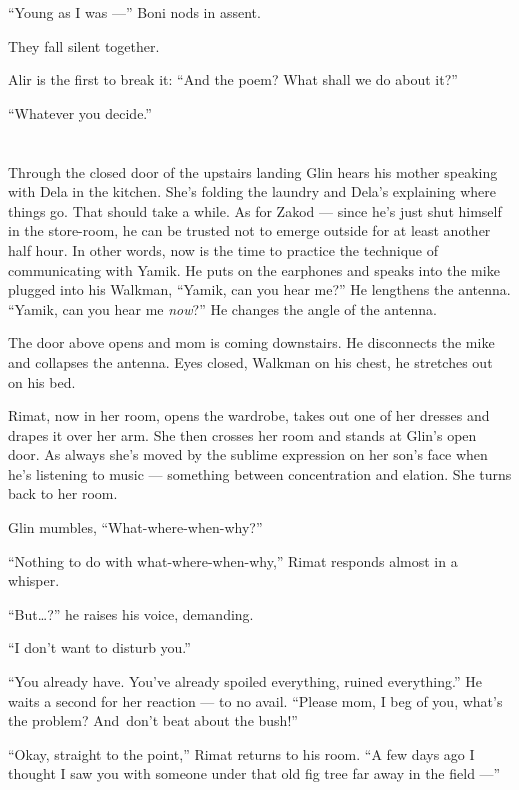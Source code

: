\documentclass[twoside,11pt,openany]{book}
\begin{document}
``Young as I was ---'' Boni nods in assent.

They fall silent together.

Alir is the first to break it: ``And the poem? What shall we do about it?''

``Whatever you decide.''


\chapter{}

Through the closed door of the upstairs landing Glin hears his mother speaking with Dela in the kitchen.  She's
folding the laundry and Dela's explaining where things go. That should take a while. As for Zakod --- since he's just
shut himself in the store-room, he can be trusted not to emerge outside for at least another half hour. In other words,
now is the time to practice the technique of communicating with Yamik. He puts on the earphones and speaks into the
mike plugged into his Walkman, ``Yamik, can you hear me?'' He lengthens the antenna.
``Yamik, can you hear me \textit{now}?'' He changes the angle of the antenna.

The door above opens and mom is coming downstairs. He disconnects the mike and collapses{ }the antenna.
Eyes closed, Walkman on his chest, he stretches out on his bed.

Rimat, now in her room, opens the wardrobe, takes out one of her dresses and drapes it over her arm. She then crosses
her room and stands at Glin's open door. As always she's moved by the sublime expression on her son's face when he's
listening to music --- something between concentration and elation. She turns back to her room.

Glin mumbles, ``What-where-when-why?''

``Nothing to do with what-where-when-why,'' Rimat responds almost in a whisper.

``But{\ldots}?'' he raises his voice, demanding.

``I don't want to disturb you.''

``You already have. You've already spoiled everything, ruined everything.'' He waits a second
for her reaction --- to no avail. ``Please mom, I beg of you, what's   the problem?  And~don't beat
about the bush!''

``Okay, straight to the point,'' Rimat returns to his room. ``A few days ago I
thought I saw you with someone under that old fig tree far away in the field ---''
\end{document}
